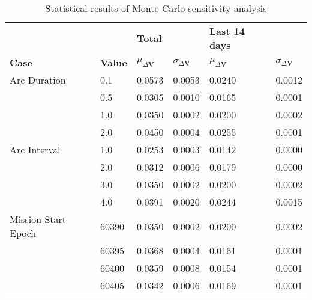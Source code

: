 \begin{table}[h!]
\centering
\begin{tabular}{llllll}
 &  & \cellcolor[HTML]{EFEFEF}\textbf{Total} &  & \cellcolor[HTML]{EFEFEF}\textbf{Last 14 days} &  \\
\rowcolor[HTML]{EFEFEF} 
\textbf{Case} & \textbf{Value} & \textbf{$\mu_{\Delta \boldsymbol{V}}$} & \textbf{$\sigma_{\Delta \boldsymbol{V}}$} & \textbf{$\mu_{\Delta \boldsymbol{V}}$} & \textbf{$\sigma_{\Delta \boldsymbol{V}}$} \\ 
Arc Duration & 0.1 & 0.0573 & 0.0053 & 0.0240 & 0.0012 \\ 
 & 0.5 & 0.0305 & 0.0010 & 0.0165 & 0.0001 \\ 
 & 1.0 & 0.0350 & 0.0002 & 0.0200 & 0.0002 \\ 
 & 2.0 & 0.0450 & 0.0004 & 0.0255 & 0.0001 \\ 
Arc Interval & 1.0 & 0.0253 & 0.0003 & 0.0142 & 0.0000 \\ 
 & 2.0 & 0.0312 & 0.0006 & 0.0179 & 0.0000 \\ 
 & 3.0 & 0.0350 & 0.0002 & 0.0200 & 0.0002 \\ 
 & 4.0 & 0.0391 & 0.0020 & 0.0244 & 0.0015 \\ 
Mission Start Epoch & 60390 & 0.0350 & 0.0002 & 0.0200 & 0.0002 \\ 
 & 60395 & 0.0368 & 0.0004 & 0.0161 & 0.0001 \\ 
 & 60400 & 0.0359 & 0.0008 & 0.0154 & 0.0001 \\ 
 & 60405 & 0.0342 & 0.0006 & 0.0169 & 0.0001 \\ 
\end{tabular}
\caption{Statistical results of Monte Carlo sensitivity analysis}
\label{tab:SensitivityAnalysis}
\end{table}